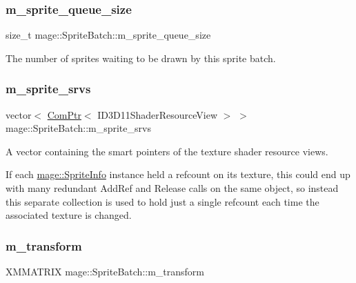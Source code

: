 \subsubsection{\texorpdfstring{m\+\_\+sprite\+\_\+queue\+\_\+size}{m\_sprite\_queue\_size}}
{\footnotesize\ttfamily size\+\_\+t mage\+::\+Sprite\+Batch\+::m\+\_\+sprite\+\_\+queue\+\_\+size\hspace{0.3cm}{\ttfamily [private]}}

The number of sprites waiting to be drawn by this sprite batch. \hypertarget{classmage_1_1_sprite_batch_adaad3bca737877db16bfa781563d8a93}{}\label{classmage_1_1_sprite_batch_adaad3bca737877db16bfa781563d8a93} 
\subsubsection{\texorpdfstring{m\+\_\+sprite\+\_\+srvs}{m\_sprite\_srvs}}
{\footnotesize\ttfamily vector$<$ \hyperlink{namespacemage_ae74f374780900893caa5555d1031fd79}{Com\+Ptr}$<$ I\+D3\+D11\+Shader\+Resource\+View $>$ $>$ mage\+::\+Sprite\+Batch\+::m\+\_\+sprite\+\_\+srvs\hspace{0.3cm}{\ttfamily [private]}}

A vector containing the smart pointers of the texture shader resource views.

If each \hyperlink{structmage_1_1_sprite_info}{mage\+::\+Sprite\+Info} instance held a refcount on its texture, this could end up with many redundant {\ttfamily Add\+Ref} and {\ttfamily Release} calls on the same object, so instead this separate collection is used to hold just a single refcount each time the associated texture is changed. \hypertarget{classmage_1_1_sprite_batch_ad8a12f1f6c8289548346d469c9436c58}{}\label{classmage_1_1_sprite_batch_ad8a12f1f6c8289548346d469c9436c58} 
\subsubsection{\texorpdfstring{m\+\_\+transform}{m\_transform}}
{\footnotesize\ttfamily X\+M\+M\+A\+T\+R\+IX mage\+::\+Sprite\+Batch\+::m\+\_\+transform\hspace{0.3cm}{\ttfamily [private]}}

